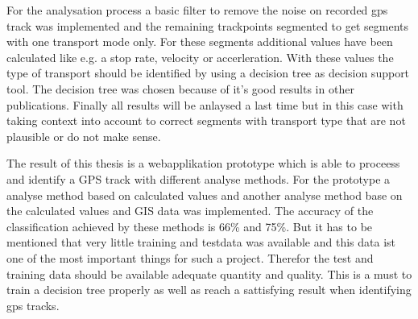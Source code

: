 For the analysation process a basic filter to remove the noise on recorded gps track was implemented and the remaining trackpoints segmented to get segments with one transport mode only. For these segments additional values have been calculated like e.g. a stop rate, velocity or accerleration. With these values the type of transport should be identified by using a decision tree as decision support tool. The decision tree was chosen because of it's good results in other publications. Finally all results will be anlaysed a last time but in this case with taking context into account to correct segments with transport type that are not plausible or do not make sense.

The result of this thesis is a webapplikation prototype which is able to proceess and identify a GPS track with different analyse methods. For the prototype a analyse method based on calculated values and another analyse method base on the calculated values and GIS data was implemented. The accuracy of the classification achieved by these methods is 66\% and 75\%. But it has to be mentioned that very little training and testdata was available and this data ist one of the most important things for such a project. Therefor the test and training data should be available adequate quantity and quality. This is a must to train a decision tree properly as well as reach a sattisfying result when identifying gps tracks.

\afterpage{\blankpage}
\newpage